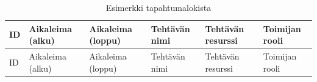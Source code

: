 \documentclass[
  finnish,
  letterpaper,
  DIV=11,
  numbers=noendperiod,
  oneside]{scrreprt}
\begin{document}
\begin{longtable}[]{@{}
  >{\raggedright\arraybackslash}p{}
  >{\raggedright\arraybackslash}p{}
  >{\raggedright\arraybackslash}p{}
  >{\raggedright\arraybackslash}p{}
  >{\raggedright\arraybackslash}p{}
  >{\raggedright\arraybackslash}p{}@{}}
\caption{Esimerkki
tapahtumalokista}\label{tbl-tapahtumaloki}\tabularnewline
\toprule\noalign{}
\begin{minipage}[b]{\linewidth}\raggedright
ID
\end{minipage} & \begin{minipage}[b]{\linewidth}\raggedright
Aikaleima (alku)
\end{minipage} & \begin{minipage}[b]{\linewidth}\raggedright
Aikaleima (loppu)
\end{minipage} & \begin{minipage}[b]{\linewidth}\raggedright
Tehtävän nimi
\end{minipage} & \begin{minipage}[b]{\linewidth}\raggedright
Tehtävän resurssi
\end{minipage} & \begin{minipage}[b]{\linewidth}\raggedright
Toimijan rooli
\end{minipage} \\
\midrule\noalign{}
\endfirsthead
\toprule\noalign{}
\begin{minipage}[b]{\linewidth}\raggedright
ID
\end{minipage} & \begin{minipage}[b]{\linewidth}\raggedright
Aikaleima (alku)
\end{minipage} & \begin{minipage}[b]{\linewidth}\raggedright
Aikaleima (loppu)
\end{minipage} & \begin{minipage}[b]{\linewidth}\raggedright
Tehtävän nimi
\end{minipage} & \begin{minipage}[b]{\linewidth}\raggedright
Tehtävän resurssi
\end{minipage} & \begin{minipage}[b]{\linewidth}\raggedright
Toimijan rooli
\end{minipage} \\

\end{longtable}
\end{document}
